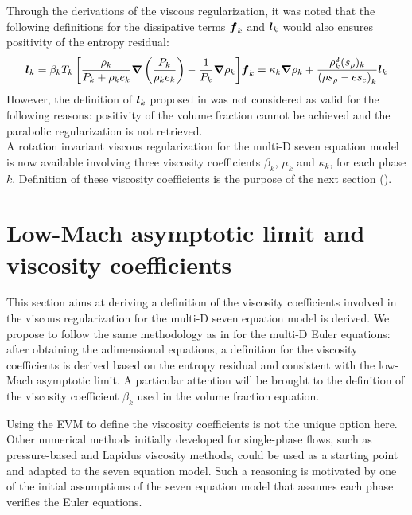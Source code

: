 %
Through the derivations of the viscous regularization, it was noted that the following definitions for the dissipative terms $\boldsymbol f_k$ and $\boldsymbol l_k$ would also ensures positivity of the entropy residual:
%
\begin{subequations}
\begin{align}\label{eq:def-l-k-wrong-sect4}
\mbold l_k =\beta_k T_k \left[ \frac{\rho_k}{P_k+\rho_k e_k} \grad \left( \frac{P_k}{\rho_k e_k} \right) - \frac{1}{P_k} \grad \rho_k \right]
\end{align}
\begin{align}
\mbold f_k = \kappa_k \grad \rho_k +  \frac{\rho^2_k (s_{\rho})_k}{\left( \rho s_{\rho} - e s_e \right)_k} \mbold l_k
\end{align}
\end{subequations}
%
However, the definition of $\boldsymbol l_k$ proposed in  was not considered as valid for the following reasons: positivity of the volume fraction cannot be achieved and the parabolic regularization is not retrieved.\\ 

A rotation invariant viscous regularization for the multi-D seven equation model is now available involving three viscosity coefficients $\beta_k$, $\mu_k$ and $\kappa_k$, for each phase $k$. Definition of these viscosity coefficients is the purpose of the next section ().
\section{Low-Mach asymptotic limit and viscosity coefficients}\label{sec:sev-equ-visc-coeff-sect4}
This section aims at deriving a definition of the viscosity coefficients involved in the viscous regularization for the multi-D seven equation model is derived. We propose to follow the same methodology as in  for the multi-D Euler equations: after obtaining the adimensional equations, a definition for the viscosity coefficients is derived based on the entropy residual and consistent with the low-Mach asymptotic limit. A particular attention will be brought to the definition of the viscosity coefficient $\beta_k$ used in the volume fraction equation.

Using the EVM to define the viscosity coefficients is not the unique option here. Other numerical methods initially developed for single-phase flows, such as pressure-based and Lapidus viscosity methods, could be used as a starting point and adapted to the seven equation model. Such a reasoning is motivated by one of the initial assumptions of the seven equation model that assumes each phase verifies the Euler equations.
